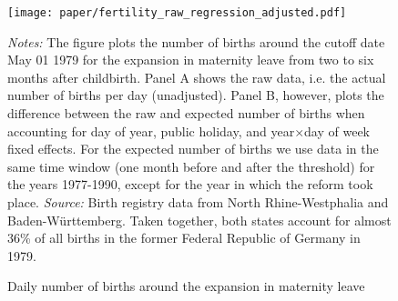 \documentclass[11pt, a4paper]{article} %
\begin{document}
	\vspace*{\fill}
\begin{figure}[H]\centering
	\caption{Daily number of births around the expansion in maternity leave}\label{fig: fertilitydistr}
	\texttt{[image: paper/fertility\_raw\_regression\_adjusted.pdf]}
	\scriptsize
	\begin{minipage}{0.9 \linewidth}
		\emph{Notes:} The figure plots the number of births around the cutoff date May 01 1979 for the expansion in maternity leave from two to six months after childbirth. Panel A shows the raw data, i.e. the actual number of births per day (unadjusted). Panel B, however, plots the difference between the raw and expected number of births when accounting for day of year, public holiday, and year$\times$day of week fixed effects. For the expected number of births we use data in the same time window (one month before and after the threshold) for the years 1977-1990, except for the year in which the reform took place. \newline\emph{Source:} Birth registry data from North Rhine-Westphalia and Baden-Württemberg. Taken together, both states account for almost 36\% of all births in the former Federal Republic of Germany in 1979.
	\end{minipage}
\end{figure}
\vspace*{\fill}\clearpage

\end{document}
